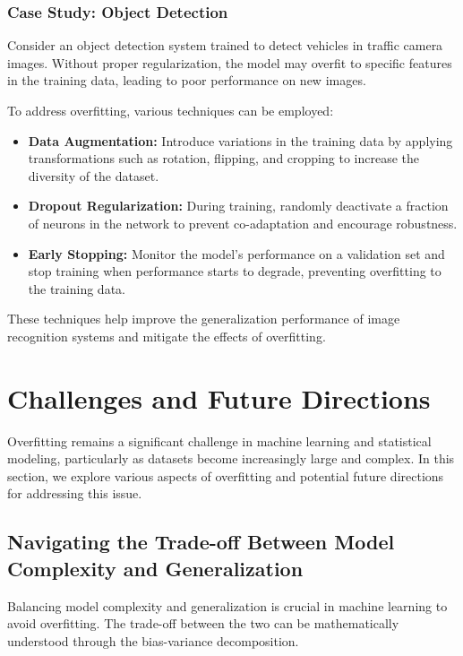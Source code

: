 \documentclass[12pt]{book} %
\begin{document}
\subsubsection{Case Study: Object Detection}

Consider an object detection system trained to detect vehicles in traffic camera images. Without proper regularization, the model may overfit to specific features in the training data, leading to poor performance on new images.

To address overfitting, various techniques can be employed:

\begin{itemize}
\item \textbf{Data Augmentation:} Introduce variations in the training data by applying transformations such as rotation, flipping, and cropping to increase the diversity of the dataset.
\item \textbf{Dropout Regularization:} During training, randomly deactivate a fraction of neurons in the network to prevent co-adaptation and encourage robustness.
\item \textbf{Early Stopping:} Monitor the model's performance on a validation set and stop training when performance starts to degrade, preventing overfitting to the training data.
\end{itemize}

These techniques help improve the generalization performance of image recognition systems and mitigate the effects of overfitting.


\section{Challenges and Future Directions}

Overfitting remains a significant challenge in machine learning and statistical modeling, particularly as datasets become increasingly large and complex. In this section, we explore various aspects of overfitting and potential future directions for addressing this issue.

\subsection{Navigating the Trade-off Between Model Complexity and Generalization}

Balancing model complexity and generalization is crucial in machine learning to avoid overfitting. The trade-off between the two can be mathematically understood through the bias-variance decomposition.
\end{document}
